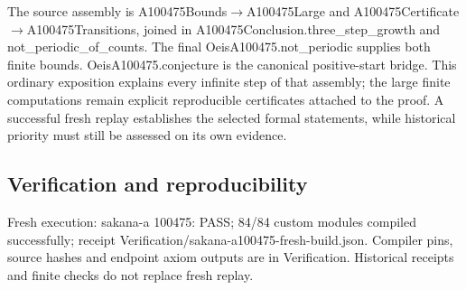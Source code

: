 \documentclass[11pt,a4paper]{article}
\begin{document}
The source assembly is A100475Bounds\ensuremath{\to}A100475Large and A100475Certificate\ensuremath{\to}A100475Transitions, joined in A100475Conclusion.three\_step\_growth and not\_periodic\_of\_counts. The final OeisA100475.not\_periodic supplies both finite bounds. OeisA100475.conjecture is the canonical positive-start bridge. This ordinary exposition explains every infinite step of that assembly; the large finite computations remain explicit reproducible certificates attached to the proof. A successful fresh replay establishes the selected formal statements, while historical priority must still be assessed on its own evidence.

\subsection{Verification and reproducibility}
Fresh execution: sakana-a 100475: PASS; 84/84 custom modules compiled successfully; receipt Verification/sakana-a100475-fresh-build.json. Compiler pins, source hashes and endpoint axiom outputs are in Verification. Historical receipts and finite checks do not replace fresh replay.
\end{document}
